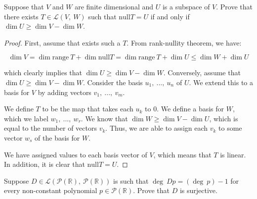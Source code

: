 \documentclass[10pt, oneside]{article}
\newenvironment{problem}[2][Problem]{\begin{trivlist}
\item[\hskip \labelsep {\bfseries #1}\hskip \labelsep {\bfseries #2.}]}{\end{trivlist}}
\newcommand{\R}{\mathbb{R}}
\newcommand{\pow}{\mathcal{P}}
\newcommand{\Null}{\text{null}}
\begin{document}
      \begin{problem}{3.19}

        Suppose that $V$ and $W$ are finite dimensional and $U$ is a subspace of $V$. Prove that there exists $T \in \mathcal{L}(V, \ W)$ such that
        $\Null T = U$ if and only if $\dim U \geq \dim V - \dim W$.

      \end{problem}

      \begin{proof}

        First, assume that exists such a $T$. From rank-nullity theorem, we have:

        $$\dim V = \dim \text{range} \ T + \dim \Null T = \dim \text{range} \ T + \dim U \leq \dim W + \dim U$$

        which clearly implies that $\dim U \geq \dim V - \dim W$. Conversely, assume that $\dim U \geq \dim V - \dim W$.
        Consider the basis $u_1, \ ..., \ u_n$ of $U$. We extend this to a basis for $V$ by adding vectors $v_1, \ ..., \ v_m$.
        \newline

        We define $T$ to be the map that takes each $u_k$ to $0$. We define a basis for $W$, which we label $w_1, \ ..., \ w_r$.
        We know that $\dim W \geq \dim V - \dim U$, which is equal to the number of vectors $v_k$. Thus, we are able to assign
        each $v_k$ to some vector $w_s$ of the basis for $W$.
        \newline

        We have assigned values to each basis vector of $V$, which means that $T$ is linear. In addition, it is clear that $\Null T = U$.

      \end{proof}

    \begin{problem}{3.26}
      Suppose $D \in \mathcal{L}(\mathcal{P}(\mathbb{R}), \ \mathcal{P}(\mathbb{R}))$ is such that $\deg \ Dp = (\deg \ p) - 1$ for
      every non-constant polynomial $p \in \pow(\R)$. Prove that $D$ is surjective.
    \end{problem}
\end{document}
